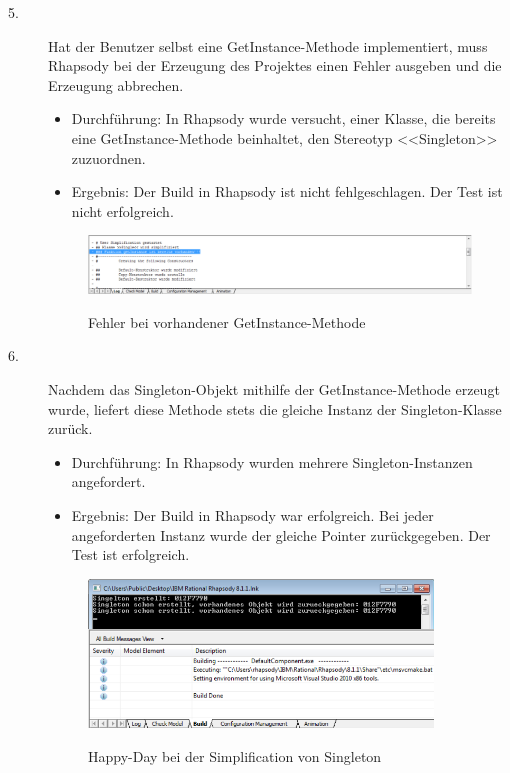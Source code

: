\begin{description}
  \item[5.]
  Hat der Benutzer selbst eine GetInstance-Methode implementiert, muss Rhapsody bei der Erzeugung des Projektes einen Fehler ausgeben und die Erzeugung abbrechen.
  \begin{itemize}
  \item{Durchführung:}
  In Rhapsody wurde versucht, einer Klasse, die bereits eine GetInstance-Methode
  beinhaltet, den Stereotyp <<Singleton>> zuzuordnen.
  \item{Ergebnis:}
  Der Build in Rhapsody ist nicht fehlgeschlagen. Der Test ist nicht
  erfolgreich.
  \end{itemize}
  \begin{figure}[!htbp]
	\centering
	\includegraphics[width=0.999\textwidth]{content/pictures/tests/singleton/getinstanceerror1}
	\label{pic:bild}
	\caption{Fehler bei vorhandener GetInstance-Methode}
\end{figure}

  \item[6.]
  Nachdem das Singleton-Objekt mithilfe der GetInstance-Methode erzeugt wurde, liefert diese Methode stets die gleiche Instanz der Singleton-Klasse zurück. 
  \begin{itemize}
  	\item{Durchführung:}
  	In Rhapsody wurden mehrere Singleton-Instanzen angefordert.
  	\item{Ergebnis:}
  	Der Build in Rhapsody war erfolgreich. Bei jeder angeforderten Instanz
  	wurde der gleiche Pointer zurückgegeben. Der Test ist erfolgreich.
  \end{itemize} 
  \begin{figure}[!htbp]
	\centering
	\includegraphics[width=0.9\textwidth]{content/pictures/tests/singleton/HappyDay1}
	\label{pic:bild}
	\caption{Happy-Day bei der Simplification von Singleton}
\end{figure}
 
\end{description}

